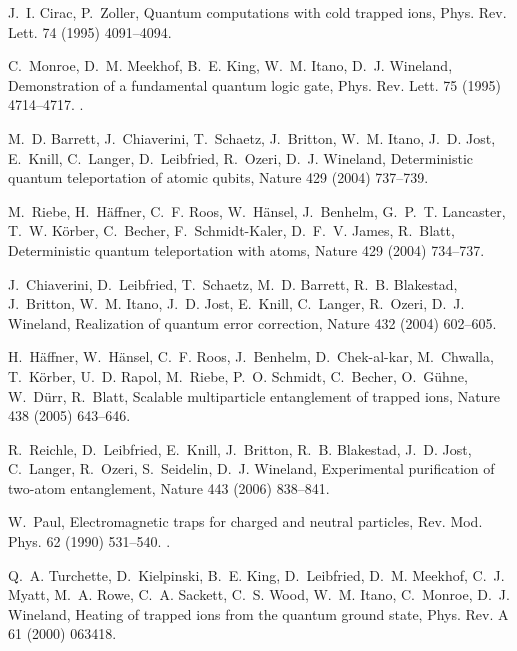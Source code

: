 \documentclass[3p,sort&compress,12pt]{elsarticle}
\begin{document}
\begin{thebibliography}{100}
J.~I. Cirac, P.~Zoller, Quantum computations with cold trapped ions, Phys. Rev.
  Lett. 74 (1995) 4091--4094.

C.~Monroe, D.~M. Meekhof, B.~E. King, W.~M. Itano, D.~J. Wineland,
  Demonstration of a fundamental quantum logic gate, Phys. Rev. Lett. 75 (1995)
  4714--4717.
\newblock \href {http://dx.doi.org/10.1103/PhysRevLett.75.4714}
  {}.

M.~D. Barrett, J.~Chiaverini, T.~Schaetz, J.~Britton, W.~M. Itano, J.~D. Jost,
  E.~Knill, C.~Langer, D.~Leibfried, R.~Ozeri, D.~J. Wineland, Deterministic
  quantum teleportation of atomic qubits, Nature 429 (2004) 737--739.

M.~Riebe, H.~H{\"a}ffner, C.~F. Roos, W.~H{\"a}nsel, J.~Benhelm, G.~P.~T.
  Lancaster, T.~W. K{\"o}rber, C.~Becher, F.~Schmidt-Kaler, D.~F.~V. James,
  R.~Blatt, Deterministic quantum teleportation with atoms, Nature 429 (2004)
  734--737.

J.~Chiaverini, D.~Leibfried, T.~Schaetz, M.~D. Barrett, R.~B. Blakestad,
  J.~Britton, W.~M. Itano, J.~D. Jost, E.~Knill, C.~Langer, R.~Ozeri, D.~J.
  Wineland, Realization of quantum error correction, Nature 432 (2004)
  602--605.

H.~H{\"a}ffner, W.~H{\"a}nsel, C.~F. Roos, J.~Benhelm, D.~{Chek-al-kar},
  M.~Chwalla, T.~K{\"o}rber, U.~D. Rapol, M.~Riebe, P.~O. Schmidt, C.~Becher,
  O.~G{\"u}hne, W.~D{\"u}rr, R.~Blatt, Scalable multiparticle entanglement of
  trapped ions, Nature 438 (2005) 643--646.

R.~Reichle, D.~Leibfried, E.~Knill, J.~Britton, R.~B. Blakestad, J.~D. Jost,
  C.~Langer, R.~Ozeri, S.~Seidelin, D.~J. Wineland, Experimental purification
  of two-atom entanglement, Nature 443 (2006) 838--841.

W.~Paul, Electromagnetic traps for charged and neutral particles, Rev. Mod.
  Phys. 62 (1990) 531--540.
\newblock \href {http://dx.doi.org/10.1103/RevModPhys.62.531}
  {}.

Q.~A. Turchette, D.~Kielpinski, B.~E. King, D.~Leibfried, D.~M. Meekhof, C.~J.
  Myatt, M.~A. Rowe, C.~A. Sackett, C.~S. Wood, W.~M. Itano, C.~Monroe, D.~J.
  Wineland, Heating of trapped ions from the quantum ground state, Phys. Rev. A
  61 (2000) 063418.


\end{thebibliography}
\end{document}
